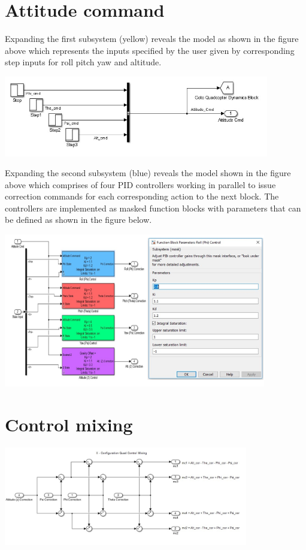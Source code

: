 \documentclass[9pt]{article}
\begin{document}
\section{Attitude command}
\noindent Expanding the first subsystem (yellow) reveals the model as shown in the figure above which represents the inputs specified by the user given by corresponding step inputs for roll pitch yaw and altitude.

\begin{center}
\includegraphics[width=0.87\textwidth]{9.jpg}
\end{center}

\noindent Expanding the second subsystem (blue) reveals the model shown in the figure above which comprises of four PID controllers working in parallel to issue correction commands for each corresponding action to the next block. The controllers are implemented as masked function blocks with parameters that can be defined as shown in the figure below.

\begin{center}
\includegraphics[width=0.86\textwidth]{10.jpg}
\end{center}

\section{Control mixing}

\begin{center}
\includegraphics[width=0.8\textwidth]{11.jpg}
\end{center}
\end{document}

